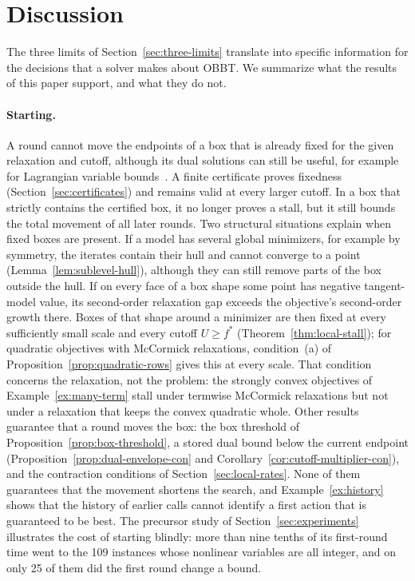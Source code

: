 \section{Discussion}\label{sec:discussion}

The three limits of Section~\ref{sec:three-limits} translate into specific
information for the decisions that a solver makes about OBBT. We summarize
what the results of this paper support, and what they do not.

\paragraph{Starting.} A round cannot move the endpoints of a box that is
already fixed for the given relaxation and cutoff, although its dual
solutions can still be useful, for example for Lagrangian variable
bounds~\cite{gleixner2017-three-enhancements-for-optimization-based}. A
finite certificate proves fixedness (Section~\ref{sec:certificates}) and
remains valid at every larger cutoff. In a box that strictly contains the
certified box, it no longer proves a stall, but it still bounds the total
movement of all later rounds. Two structural situations explain when fixed
boxes are present. If a model has several global minimizers, for example by
symmetry, the iterates contain their hull and cannot converge to a point
(Lemma~\ref{lem:sublevel-hull}), although they can still remove parts of
the box outside the hull. If on every face of a box shape some point has
negative tangent-model value, its second-order relaxation gap exceeds the
objective's second-order growth there. Boxes of that shape around a minimizer
are then fixed at every sufficiently small scale and every cutoff $U\ge f^*$
(Theorem~\ref{thm:local-stall}); for quadratic objectives with McCormick
relaxations, condition~(a) of Proposition~\ref{prop:quadratic-rows} gives
this at every scale. That condition concerns the relaxation, not the
problem: the strongly convex objectives of Example~\ref{ex:many-term} stall
under termwise McCormick relaxations but not under a relaxation that keeps
the convex quadratic whole. Other results guarantee that a round moves the
box: the box threshold of Proposition~\ref{prop:box-threshold}, a stored
dual bound below the current endpoint
(Proposition~\ref{prop:dual-envelope-con} and
Corollary~\ref{cor:cutoff-multiplier-con}), and the contraction conditions
of Section~\ref{sec:local-rates}. None of them guarantees that the movement
shortens the search, and Example~\ref{ex:history} shows that the history of
earlier calls cannot identify a first action that is guaranteed to be best.
The precursor study of Section~\ref{sec:experiments} illustrates the cost
of starting blindly: more than nine tenths of its first-round time went to
the 109 instances whose nonlinear variables are all integer, and on only 25
of them did the first round change a bound.

